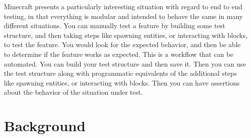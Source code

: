 \documentclass{article}
\begin{document}
\begin{doublespacing}
Minecraft presents a particularly interesting situation with regard to end to end testing, in that everything is modular and intended to behave the same in many different situations. You can manually test a feature by building some test structure, and then taking steps like spawning entities, or interacting with blocks, to test the feature. You would look for the expected behavior, and then be able to determine if the feature works as expected. This is a workflow that can be automated. You can build your test structure and then save it. Then you can use the test structure along with programmatic equivalents of the additional steps like spawning entities, or interacting with blocks. Then you can have assertions about the behavior of the situation under test. 

\section{Background}


\end{doublespacing}
\end{document}
